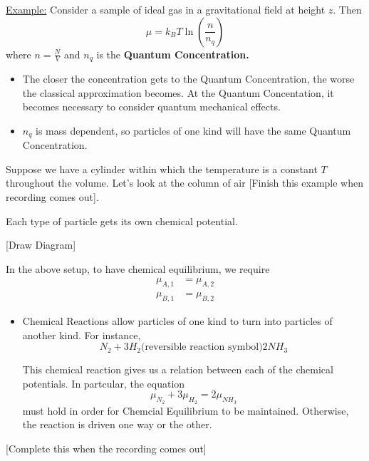 \documentclass{article}
\begin{document}
\begin{dottedbox}
  \underline{Example:} Consider a sample of ideal gas in a gravitational field at height $z$. Then
  \[ \mu = k_B T \ln\left( \frac{n}{n_q} \right) \]
  where $n = \frac{N}{V}$ and $n_q$ is the \textbf{Quantum Concentration.}
  \begin{itemize}
    \item The closer the concentration gets to the Quantum Concentration, the worse the classical approximation becomes. At the Quantum Concentation, it becomes necessary to consider quantum mechanical effects.
    \item $n_q$ is mass dependent, so particles of one kind will have the same Quantum Concentration.
  \end{itemize}
\end{dottedbox}

\vskip 0.5cm
\begin{dottedbox}
  Suppose we have a cylinder within which the temperature is a constant $T$ throughout the volume. Let's look at the column of air 
  [Finish this example when recording comes out].
\end{dottedbox}

\begin{dottedbox}
  Each type of particle gets its own chemical potential.
    
  \vskip 0.5cm
  [Draw Diagram]

  \vskip 0.5cm
  In the above setup, to have chemical equilibrium, we require
  \begin{align*}
    \mu_{A, 1} &= \mu_{A, 2} \\
    \mu_{B, 1} &= \mu_{B, 2} 
  \end{align*}

  \begin{itemize}
    \item Chemical Reactions allow particles of one kind to turn into particles of another kind. For instance, 
    \[ N_2 + 3H_2 \text{(reversible reaction symbol)} 2NH_3 \]

    This chemical reaction gives us a relation between each of the chemical potentials. In partcular, the equation 
    \[ \mu_{N_2} + 3\mu_{H_2} = 2\mu_{NH_3} \]
    must hold in order for Chemcial Equilibrium to be maintained. Otherwise, the reaction is driven one way or the other.
  \end{itemize}
  
  [Complete this when the recording comes out]
\end{dottedbox}
\end{document}
